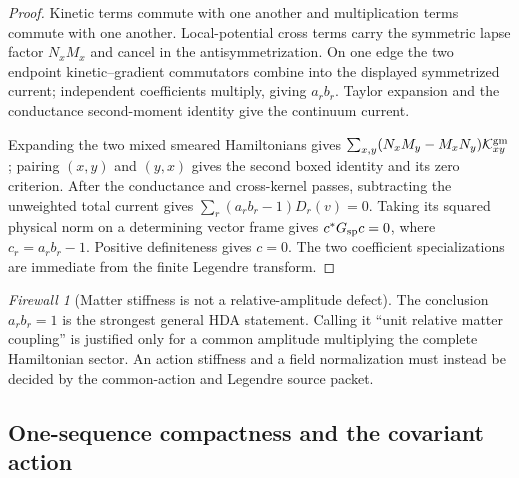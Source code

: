 \documentclass[11pt]{article}
\theoremstyle{definition}
\theoremstyle{remark}
\newtheorem{firewall}[theorem]{Firewall}
\begin{document}
\begin{proof}
Kinetic terms commute with one another and multiplication terms commute with
one another.  Local-potential cross terms carry the symmetric lapse factor
\(N_xM_x\) and cancel in the antisymmetrization.  On one edge the two endpoint
kinetic--gradient commutators combine into the displayed symmetrized current;
independent coefficients multiply, giving \(a_rb_r\).  Taylor expansion and
the conductance second-moment identity give the continuum current.

Expanding the two mixed smeared Hamiltonians gives
\(\sum_{x,y}(N_xM_y-M_xN_y)\mathcal K_{xy}^{\rm gm}\); pairing \((x,y)\) and
\((y,x)\) gives the second boxed identity and its zero criterion.  After the
conductance and cross-kernel passes, subtracting the unweighted total current
gives
\(\sum_r(a_rb_r-1)D_r(v)=0\).  Taking its squared physical norm on a
determining vector frame gives \(c^*G_{\rm sp}c=0\), where
\(c_r=a_rb_r-1\).  Positive definiteness gives \(c=0\).  The two coefficient
specializations are immediate from the finite Legendre transform.
\end{proof}

\begin{firewall}[Matter stiffness is not a relative-amplitude defect]
The conclusion \(a_rb_r=1\) is the strongest general HDA statement.  Calling
it ``unit relative matter coupling'' is justified only for a common amplitude
multiplying the complete Hamiltonian sector.  An action stiffness and a field
normalization must instead be decided by the common-action and Legendre source
packet.
\end{firewall}

\subsection{One-sequence compactness and the covariant action}
\end{document}

